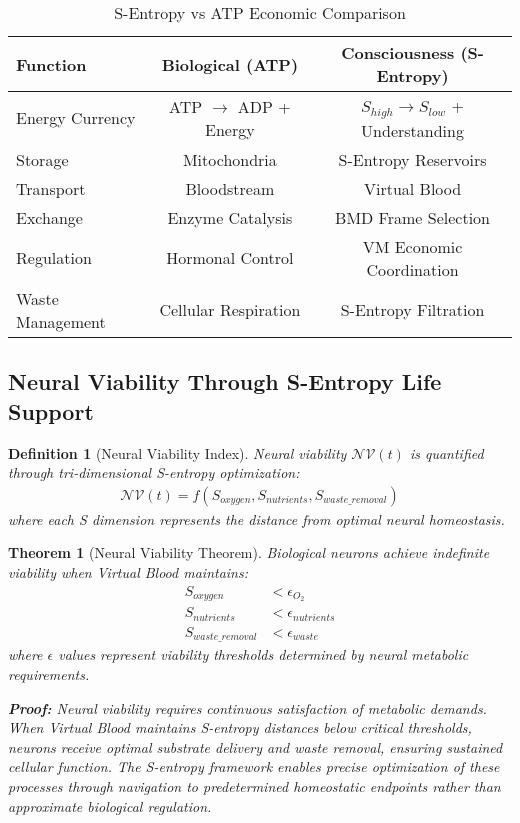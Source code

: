 \documentclass[12pt,a4paper]{article}
\newtheorem{theorem}{Theorem}
\newtheorem{definition}{Definition}
\begin{document}
\begin{table}[htbp]
\centering
\caption{S-Entropy vs ATP Economic Comparison}
\begin{tabular}{@{}lcc@{}}
\toprule
\textbf{Function} & \textbf{Biological (ATP)} & \textbf{Consciousness (S-Entropy)} \\
\midrule
Energy Currency & ATP $\rightarrow$ ADP + Energy & $S_{high} \rightarrow S_{low}$ + Understanding \\
Storage & Mitochondria & S-Entropy Reservoirs \\
Transport & Bloodstream & Virtual Blood \\
Exchange & Enzyme Catalysis & BMD Frame Selection \\
Regulation & Hormonal Control & VM Economic Coordination \\
Waste Management & Cellular Respiration & S-Entropy Filtration \\
\bottomrule
\end{tabular}
\end{table}

\subsection{Neural Viability Through S-Entropy Life Support}

\begin{definition}[Neural Viability Index]
Neural viability $\mathcal{NV}(t)$ is quantified through tri-dimensional S-entropy optimization:
\begin{align}
\mathcal{NV}(t) = f(S_{oxygen}, S_{nutrients}, S_{waste\_removal})
\end{align}
where each S dimension represents the distance from optimal neural homeostasis.
\end{definition}

\begin{theorem}[Neural Viability Theorem]
Biological neurons achieve indefinite viability when Virtual Blood maintains:
\begin{align}
S_{oxygen} &< \epsilon_{O_2} \\
S_{nutrients} &< \epsilon_{nutrients} \\
S_{waste\_removal} &< \epsilon_{waste}
\end{align}
where $\epsilon$ values represent viability thresholds determined by neural metabolic requirements.

\textbf{Proof:}
Neural viability requires continuous satisfaction of metabolic demands. When Virtual Blood maintains S-entropy distances below critical thresholds, neurons receive optimal substrate delivery and waste removal, ensuring sustained cellular function. The S-entropy framework enables precise optimization of these processes through navigation to predetermined homeostatic endpoints rather than approximate biological regulation.
\end{theorem}
\end{document}
